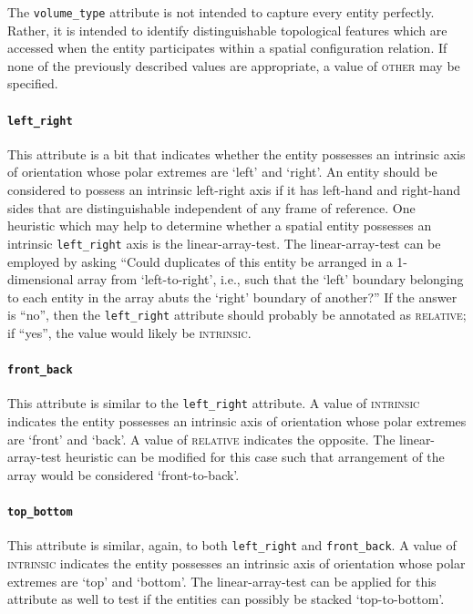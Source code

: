 \documentclass[11pt]{article}
\begin{document}
The \texttt{volume\_type} attribute is not intended to capture every entity perfectly. Rather, it is intended to identify distinguishable topological features which are accessed when the entity participates within a spatial configuration relation. If none of the previously described values are appropriate, a value of \textsc{other} may be specified.

\paragraph{\texttt{left\_right}} %
\label{par:left_right}
This attribute is a bit that indicates whether the entity possesses an intrinsic axis of orientation whose polar extremes are `left' and `right'. An entity should be considered to possess an intrinsic left-right axis if it has left-hand and right-hand sides that are distinguishable independent of any frame of reference. One heuristic which may help to determine whether a spatial entity possesses an intrinsic \texttt{left\_right} axis is the linear-array-test. The linear-array-test can be employed by asking ``Could duplicates of this entity be arranged in a 1-dimensional array from `left-to-right', i.e., such that the `left' boundary belonging to each entity in the array abuts the `right' boundary of another?'' If the answer is ``no'', then the \texttt{left\_right} attribute should probably be annotated as \textsc{relative}; if ``yes'', the value would likely be \textsc{intrinsic}.

\paragraph{\texttt{front\_back}} %
\label{par:front_back}
This attribute is similar to the \texttt{left\_right} attribute. A value of \textsc{intrinsic} indicates the entity possesses an intrinsic axis of orientation whose polar extremes are `front' and `back'. A value of \textsc{relative} indicates the opposite. The linear-array-test heuristic can be modified for this case such that arrangement of the array would be considered `front-to-back'.

\paragraph{\texttt{top\_bottom}} %
\label{par:top_bottom}
This attribute is similar, again, to both \texttt{left\_right} and \texttt{front\_back}. A value of \textsc{intrinsic} indicates the entity possesses an intrinsic axis of orientation whose polar extremes are `top' and `bottom'. The linear-array-test can be applied for this attribute as well to test if the entities can possibly be stacked `top-to-bottom'.
\end{document}
